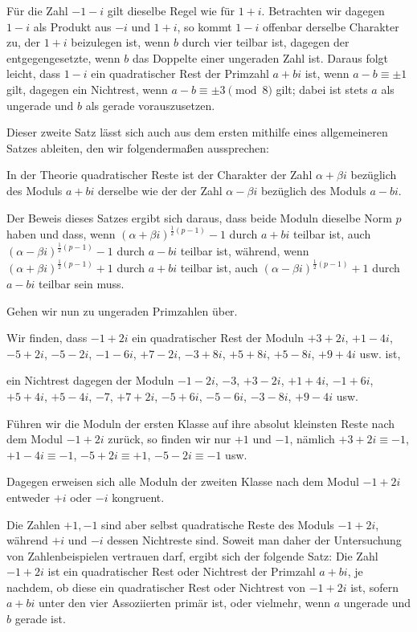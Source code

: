 Für die Zahl $-1-i$ gilt dieselbe Regel wie für $1+i$. Betrachten wir dagegen $1-i$ als Produkt aus $-i$ und $1+i$, so kommt $1-i$ offenbar derselbe Charakter zu, der $1+i$ beizulegen ist, wenn $b$ durch vier teilbar ist, dagegen der entgegengesetzte, wenn $b$ das Doppelte einer ungeraden Zahl ist. Daraus folgt leicht, dass $1-i$ ein quadratischer Rest der Primzahl $a+bi$ ist, wenn $a-b\equiv\pm1$ gilt, dagegen ein Nichtrest, wenn $a-b\equiv\pm3\pmod8$ gilt; dabei ist stets $a$ als ungerade und $b$ als gerade vorauszusetzen.

Dieser zweite Satz lässt sich auch aus dem ersten mithilfe eines allgemeineren Satzes ableiten, den wir folgendermaßen aussprechen:

%
In der Theorie quadratischer Reste ist der Charakter der Zahl $\alpha+\beta i$ bezüglich des Moduls $a+bi$ derselbe wie der der Zahl $\alpha-\beta i$ bezüglich des Moduls $a-bi$.

Der Beweis dieses Satzes ergibt sich daraus, dass beide Moduln dieselbe Norm $p$ haben und dass, wenn $(\alpha+\beta i)^{\frac12(p-1)}-1$ durch $a+bi$ teilbar ist, auch $(\alpha-\beta i)^{\frac12(p-1)}-1$ durch $a-bi$ teilbar ist, während, wenn $(\alpha+\beta i)^{\frac12(p-1)}+1$ durch $a+bi$ teilbar ist, auch $(\alpha-\beta i)^{\frac12(p-1)}+1$ durch $a-bi$ teilbar sein muss.

Gehen wir nun zu ungeraden Primzahlen über.

Wir finden, dass $-1+2i$ ein quadratischer Rest der Moduln $+3+2i$, $+1-4i$, $-5+2i$, $-5-2i$, $-1-6i$, $+7-2i$, $-3+8i$, $+5+8i$, $+5-8i$, $+9+4i$ usw. ist,

ein Nichtrest dagegen der Moduln $-1-2i$, $-3$, $+3-2i$, $+1+4i$, $-1+6i$, $+5+4i$, $+5-4i$, $-7$, $+7+2i$, $-5+6i$, $-5-6i$, $-3-8i$, $+9-4i$ usw.

Führen wir die Moduln der ersten Klasse auf ihre absolut kleinsten Reste nach dem Modul $-1+2i$ zurück, so finden wir nur $+1$ und $-1$, nämlich $+3+2i\equiv-1$, $+1-4i\equiv-1$, $-5+2i\equiv+1$, $-5-2i\equiv-1$ usw.

Dagegen erweisen sich alle Moduln der zweiten Klasse nach dem Modul $-1+2i$ entweder $+i$ oder $-i$ kongruent.

Die Zahlen $+1,-1$ sind aber selbst quadratische Reste des Moduls $-1+2i$, während $+i$ und $-i$ dessen Nichtreste sind. Soweit man daher der Untersuchung von Zahlenbeispielen vertrauen darf, ergibt sich der folgende Satz: Die Zahl $-1+2i$ ist ein quadratischer Rest oder Nichtrest der Primzahl $a+bi$, je nachdem, ob diese ein quadratischer Rest oder Nichtrest von $-1+2i$ ist, sofern $a+bi$ unter den vier Assoziierten primär ist, oder vielmehr, wenn $a$ ungerade und $b$ gerade ist.

